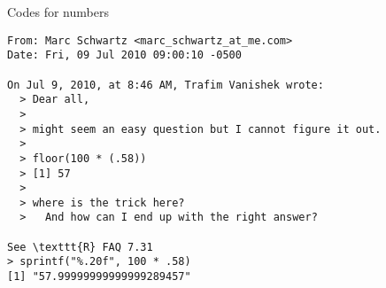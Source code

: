 \documentclass[11pt,compress,t,notes=noshow, xcolor=table]{beamer}
\begin{document}
\begin{vbframe}{Codes for numbers}
\framebreak
\vspace*{-0.5cm}
\begin{verbatim}
From: Marc Schwartz <marc_schwartz_at_me.com>
Date: Fri, 09 Jul 2010 09:00:10 -0500

On Jul 9, 2010, at 8:46 AM, Trafim Vanishek wrote:
  > Dear all,
  >
  > might seem an easy question but I cannot figure it out.
  >
  > floor(100 * (.58))
  > [1] 57
  >
  > where is the trick here?
  >   And how can I end up with the right answer?

See \texttt{R} FAQ 7.31
> sprintf("%.20f", 100 * .58)
[1] "57.99999999999999289457"
\end{verbatim}
\end{vbframe}

\endlecture
\end{document}
